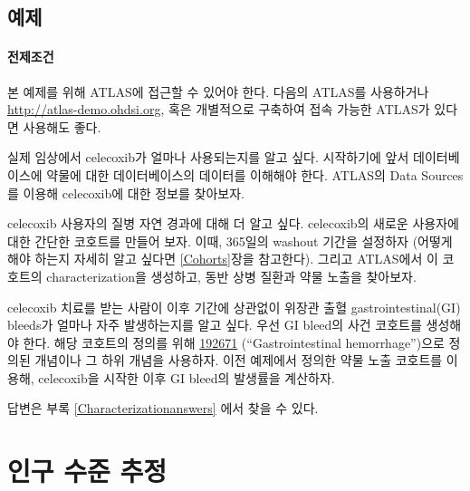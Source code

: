 \documentclass[10.5pt]{book}
\theoremstyle{definition}
\theoremstyle{definition}
\theoremstyle{definition}
\theoremstyle{remark}
\let\BeginKnitrBlock\begin \let\EndKnitrBlock\end
\begin{document}
\section{예제}\label{-6}

\subsubsection*{전제조건}\label{-4}

본 예제를 위해 ATLAS에 접근할 수 있어야 한다. 다음의 ATLAS를 사용하거나
\url{http://atlas-demo.ohdsi.org}, 혹은 개별적으로 구축하여 접속 가능한
ATLAS가 있다면 사용해도 좋다.

\BeginKnitrBlock{exercise}
\protect\hypertarget{exr:exerciseCharacterization1}{}{\label{exr:exerciseCharacterization1}
}실제 임상에서 celecoxib가 얼마나 사용되는지를 알고 싶다. 시작하기에
앞서 데이터베이스에 약물에 대한 데이터베이스의 데이터를 이해해야 한다.
ATLAS의 Data Sources를 이용해 celecoxib에 대한 정보를 찾아보자.
\EndKnitrBlock{exercise}

\BeginKnitrBlock{exercise}
\protect\hypertarget{exr:exerciseCharacterization2}{}{\label{exr:exerciseCharacterization2}
}celecoxib 사용자의 질병 자연 경과에 대해 더 알고 싶다. celecoxib의
새로운 사용자에 대한 간단한 코호트를 만들어 보자. 이때, 365일의 washout
기간을 설정하자 (어떻게 해야 하는지 자세히 알고 싶다면 \ref{Cohorts}장을
참고한다). 그리고 ATLAS에서 이 코호트의 characterization을 생성하고,
동반 상병 질환과 약물 노출을 찾아보자.
\EndKnitrBlock{exercise}

\BeginKnitrBlock{exercise}
\protect\hypertarget{exr:exerciseCharacterization3}{}{\label{exr:exerciseCharacterization3}
}celecoxib 치료를 받는 사람이 이후 기간에 상관없이 위장관 출혈
gastrointestinal(GI) bleeds가 얼마나 자주 발생하는지를 알고 싶다. 우선
GI bleed의 사건 코호트를 생성해야 한다. 해당 코호트의 정의를 위해
\href{http://athena.ohdsi.org/search-terms/terms/192671}{192671}
(``Gastrointestinal hemorrhage'')으로 정의된 개념이나 그 하위 개념을
사용하자. 이전 예제에서 정의한 약물 노출 코호트를 이용해, celecoxib을
시작한 이후 GI bleed의 발생률을 계산하자.
\EndKnitrBlock{exercise}

답변은 부록 \ref{Characterizationanswers} 에서 찾을 수 있다.

\chapter{인구 수준 추정}\label{PopulationLevelEstimation}
\end{document}
